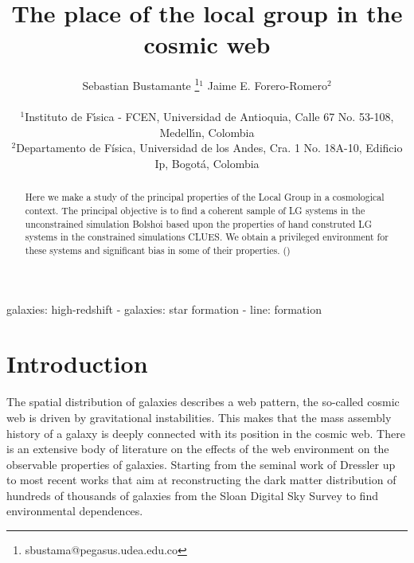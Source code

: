 \documentclass[usenatbib]{latex/mn2e}
\begin{document}
\title[LG Environment]{The place of the local group in the cosmic web}
\author[S. Bustamante and J.E. Forero-Romero]{
\parbox[t]{\textwidth}{\raggedright 
  Sebastian Bustamante \thanks{sbustama@pegasus.udea.edu.co}$^{1}$ 
  Jaime E. Forero-Romero$^{2}$ 
}
\vspace*{6pt}\\
$^1$Instituto de F\'{\i}sica - FCEN, Universidad de Antioquia, Calle
67 No. 53-108, Medell\'{\i}n, Colombia\\ 
$^2$Departamento de F\'{i}sica, Universidad de los Andes, Cra. 1
No. 18A-10, Edificio Ip, Bogot\'a, Colombia
}

\maketitle

\begin{abstract}
Here we make a study of the principal properties of the Local Group in a 
cosmological context. The principal objective is to find a coherent 
sample of LG systems in the unconstrained simulation Bolshoi based upon 
the properties of hand construted LG systems in the constrained 
simulations CLUES. We obtain a privileged environment for these systems 
and significant bias in some of their properties. ()


\end{abstract}

\begin{keywords}
galaxies: high-redshift - galaxies: star formation - line: formation
\end{keywords}



\section{Introduction}
\label{sec:introduction}


The spatial distribution of galaxies describes a web pattern, the 
so-called cosmic web is driven by gravitational instabilities. This makes 
that the mass assembly history of a galaxy is deeply connected with its 
position in the cosmic web. There is an extensive body of literature on 
the effects of the web environment on the observable properties of 
galaxies. Starting from the seminal work of Dressler  
up to most recent works that aim at reconstructing the dark matter 
distribution of hundreds of thousands of galaxies from the Sloan Digital 
Sky Survey to find environmental dependences. 
\end{document}
